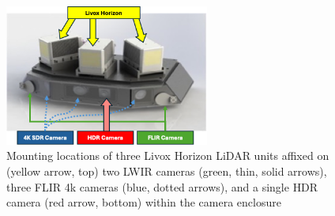 \documentclass{erauthesis}
\begin{document}
\begin{figure}[htbp]
\centering
\includegraphics[width=0.6\textwidth]{Images/Camera_enclosure2.png}
\caption{Mounting locations of three Livox Horizon LiDAR units affixed on (yellow arrow, top) two LWIR cameras (green, thin, solid arrows), three FLIR 4k cameras (blue, dotted arrows), and a single \ac{HDR} camera  (red arrow, bottom) within the camera enclosure}
\label{fig:camera_enclosure}
\end{figure}

\end{document}
